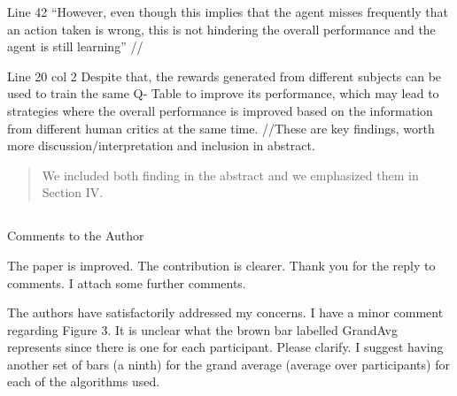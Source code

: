 \documentclass[journal,onecolumn,12pt]{IEEEtran}
\begin{document}
Line 42 “However, even though this implies that the agent misses frequently that an action taken is wrong, this is not hindering the overall performance and the agent is still learning” //

Line 20 col 2 Despite that, the rewards generated from different subjects can be used to train the same Q- Table to improve its performance, which may lead to strategies where the overall performance is improved based on the information from different human critics at the same time.
//These are key findings, worth more discussion/interpretation and inclusion in abstract.

\begin{quotation}
{\color{blue}
We included both finding in the abstract and we emphasized them  in Section IV. 
}
\end{quotation}


\subsection*{}

Comments to the Author

The paper is improved. The contribution is clearer. Thank you for the reply to comments. I attach some further comments.

The authors have satisfactorily addressed my concerns. I have a minor comment regarding Figure 3. It is unclear what the brown bar labelled GrandAvg represents since there is one for each participant. Please clarify. I suggest having another set of bars (a ninth) for the grand average (average over participants) for each of the algorithms used.
\end{document}
